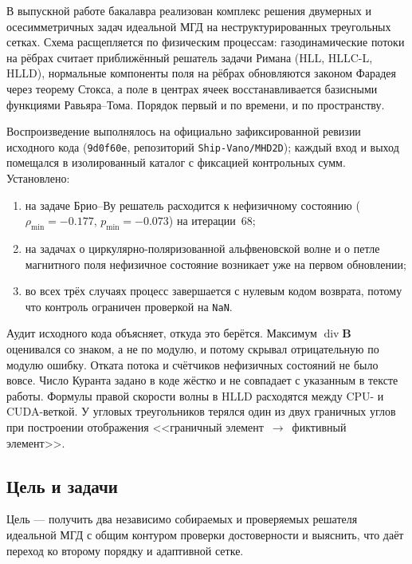 \documentclass[12pt,a4paper]{article}
\newcommand{\divg}{\operatorname{div}}
\newcommand{\B}{\mathbf{B}}
\newcommand{\code}[1]{\texttt{#1}}
\begin{document}
В выпускной работе бакалавра \cite{shamanov2025} реализован комплекс решения
двумерных и осесимметричных задач идеальной МГД на неструктурированных
треугольных сетках. Схема расщепляется по физическим процессам: газодинамические
потоки на рёбрах считает приближённый решатель задачи Римана (HLL, HLLC-L,
HLLD), нормальные компоненты поля на рёбрах обновляются законом Фарадея через
теорему Стокса, а поле в центрах ячеек восстанавливается базисными функциями
Равьяра--Тома. Порядок первый и по времени, и по пространству.

Воспроизведение выполнялось на официально зафиксированной ревизии исходного
кода (\code{9d0f60e}, репозиторий \code{Ship-Vano/MHD2D}); каждый вход и выход
помещался в изолированный каталог с фиксацией контрольных сумм. Установлено:

\begin{enumerate}[nosep]
\item на задаче Брио--Ву решатель расходится к нефизичному состоянию
  ($\rho_{\min}=-0.177$, $p_{\min}=-0.073$) на итерации~68;
\item на задачах о циркулярно-поляризованной альфвеновской волне и о петле
  магнитного поля нефизичное состояние возникает уже на первом обновлении;
\item во всех трёх случаях процесс завершается с нулевым кодом возврата, потому
  что контроль ограничен проверкой на \code{NaN}.
\end{enumerate}

Аудит исходного кода объясняет, откуда это берётся. Максимум $\divg\B$ оценивался
со знаком, а не по модулю, и потому скрывал отрицательную по модулю ошибку.
Отката потока и счётчиков нефизичных состояний не было вовсе. Число Куранта
задано в коде жёстко и не совпадает с указанным в тексте работы. Формулы правой
скорости волны в HLLD расходятся между CPU- и CUDA-веткой. У угловых
треугольников терялся один из двух граничных углов при построении отображения
<<граничный элемент~$\to$~фиктивный элемент>>.

\subsection{Цель и задачи}

Цель — получить два независимо собираемых и проверяемых решателя идеальной МГД с
общим контуром проверки достоверности и выяснить, что даёт переход ко второму
порядку и адаптивной сетке.
\end{document}
